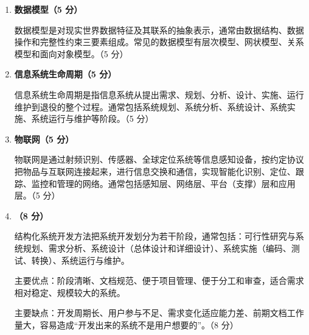 \documentclass[a4paper,11pt]{article}
\begin{document}

\begin{enumerate}[start=29, label=\textbf{\arabic*.}, leftmargin=2.4em, itemsep=0.55em]

\item \textbf{数据模型（5 分）}

数据模型是对现实世界数据特征及其联系的抽象表示，通常由数据结构、数据操作和完整性约束三要素组成。常见的数据模型有层次模型、网状模型、关系模型和面向对象模型。\hfill（5 分）

\item \textbf{信息系统生命周期（5 分）}

信息系统生命周期是指信息系统从提出需求、规划、分析、设计、实施、运行维护到退役的整个过程。通常包括系统规划、系统分析、系统设计、系统实施、系统运行与维护等阶段。\hfill（5 分）

\item \textbf{物联网（5 分）}

物联网是通过射频识别、传感器、全球定位系统等信息感知设备，按约定协议把物品与互联网连接起来，进行信息交换和通信，实现智能化识别、定位、跟踪、监控和管理的网络。通常包括感知层、网络层、平台（支撑）层和应用层。\hfill（5 分）

\item \textbf{（8 分）}

结构化系统开发方法把系统开发划分为若干阶段，通常包括：可行性研究与系统规划、需求分析、系统设计（总体设计和详细设计）、系统实施（编码、测试、转换）、系统运行与维护。

主要优点：阶段清晰、文档规范、便于项目管理、便于分工和审查，适合需求相对稳定、规模较大的系统。

主要缺点：开发周期长、用户参与不足、需求变化适应能力差、前期文档工作量大，容易造成“开发出来的系统不是用户想要的”。\hfill（8 分）


\end{enumerate}
\end{document}
